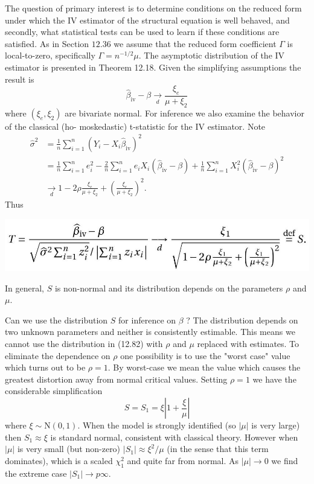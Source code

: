 \documentclass[10pt]{article}
\begin{document}
The question of primary interest is to determine conditions on the reduced form under which the IV estimator of the structural equation is well behaved, and secondly, what statistical tests can be used to learn if these conditions are satisfied. As in Section $12.36$ we assume that the reduced form coefficient $\Gamma$ is local-to-zero, specifically $\Gamma=n^{-1 / 2} \mu$. The asymptotic distribution of the IV estimator is presented in Theorem 12.18. Given the simplifying assumptions the result is
$$
\widehat{\beta}_{\mathrm{iv}}-\beta \underset{d}{\longrightarrow} \frac{\xi_{e}}{\mu+\xi_{2}}
$$
where $\left(\xi_{e}, \xi_{2}\right)$ are bivariate normal. For inference we also examine the behavior of the classical (ho- moskedastic) t-statistic for the IV estimator. Note
$$
\begin{aligned}
\widehat{\sigma}^{2} &=\frac{1}{n} \sum_{i=1}^{n}\left(Y_{i}-X_{i} \widehat{\beta}_{\mathrm{iv}}\right)^{2} \\
&=\frac{1}{n} \sum_{i=1}^{n} e_{i}^{2}-\frac{2}{n} \sum_{i=1}^{n} e_{i} X_{i}\left(\widehat{\beta}_{\mathrm{iv}}-\beta\right)+\frac{1}{n} \sum_{i=1}^{n} X_{i}^{2}\left(\widehat{\beta}_{\mathrm{iv}}-\beta\right)^{2} \\
& \underset{d}{\longrightarrow} 1-2 \rho \frac{\xi_{e}}{\mu+\xi_{2}}+\left(\frac{\xi_{e}}{\mu+\xi_{2}}\right)^{2} .
\end{aligned}
$$
Thus

\includegraphics[max width=\textwidth]{2022_09_17_f9391324ededdbb7a34eg-63}

In general, $S$ is non-normal and its distribution depends on the parameters $\rho$ and $\mu$.

Can we use the distribution $S$ for inference on $\beta$ ? The distribution depends on two unknown parameters and neither is consistently estimable. This means we cannot use the distribution in (12.82) with $\rho$ and $\mu$ replaced with estimates. To eliminate the dependence on $\rho$ one possibility is to use the "worst case" value which turns out to be $\rho=1$. By worst-case we mean the value which causes the greatest distortion away from normal critical values. Setting $\rho=1$ we have the considerable simplification
$$
S=S_{1}=\xi\left|1+\frac{\xi}{\mu}\right|
$$
where $\xi \sim \mathrm{N}(0,1)$. When the model is strongly identified (so $|\mu|$ is very large) then $S_{1} \approx \xi$ is standard normal, consistent with classical theory. However when $|\mu|$ is very small (but non-zero) $\left|S_{1}\right| \approx \xi^{2} / \mu$ (in the sense that this term dominates), which is a scaled $\chi_{1}^{2}$ and quite far from normal. As $|\mu| \rightarrow 0$ we find the extreme case $\left|S_{1}\right| \rightarrow p \infty$.
\end{document}
